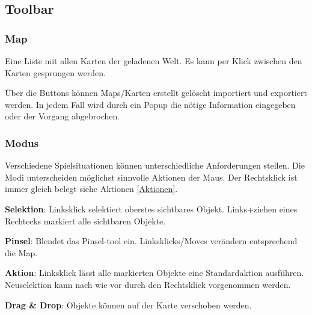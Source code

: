 \documentclass[german,10pt,a4paper,twocolumn,colorscheme=darkblue]{orarticle}
\begin{document}
		\subsection{Toolbar}
		\subsubsection*{Map}
			Eine Liste mit allen Karten der geladenen Welt. Es kann per Klick zwischen den Karten gesprungen werden.
			
			Über die Buttons können Maps/Karten erstellt gelöscht importiert und exportiert werden. In jedem Fall wird durch ein Popup die nötige Information eingegeben oder der Vorgang abgebrochen.
		\subsubsection*{Modus}
			Verschiedene Spielsituationen können unterschiedliche Anforderungen stellen. Die Modi unterscheiden möglichst sinnvolle Aktionen der Maus. Der Rechtsklick ist immer gleich belegt siehe Aktionen \ref{Aktionen}.
			
			\textbf{Selektion}: Linksklick selektiert oberstes sichtbares Objekt. Links+ziehen eines Rechtecks markiert alle sichtbaren Objekte.
			
			\textbf{Pinsel}: Blendet das Pinsel-tool ein. Linksklicks/Moves verändern entsprechend die Map.
			
			\textbf{Aktion}: Linksklick lässt alle markierten Objekte eine Standardaktion ausführen. Neuselektion kann nach wie vor durch den Rechtsklick vorgenommen werden.
			
			\textbf{Drag \& Drop}: Objekte können auf der Karte verschoben werden.
						
\end{document}
